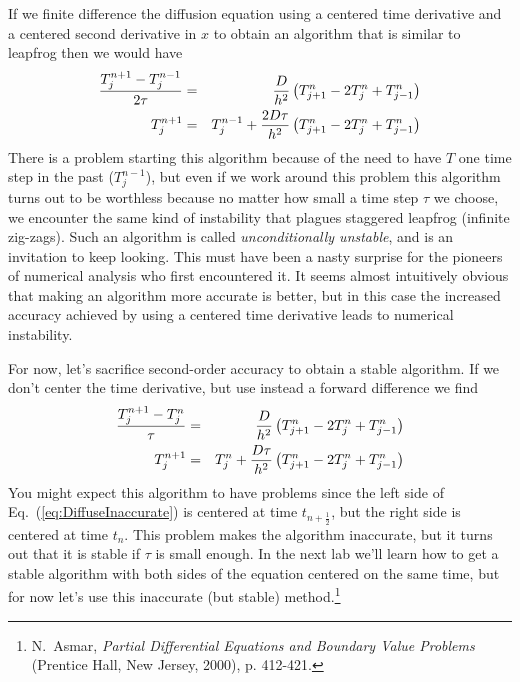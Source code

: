 If we finite difference the diffusion equation using a centered time
derivative and a centered second derivative in $x$ to obtain an
algorithm that is similar to leapfrog then we would have
\begin{eqnarray}
    {T_j^{n+1}-T_j^{n-1} \over 2 \tau} &=&
    {D \over h^2} \left( T^n_{j+1}-2T^n_j+T^n_{j-1} \right)
    \\
    T^{n+1}_j &=& T^{n-1}_j + {2 D \tau \over h^2}
    \left( T^n_{j+1}-2T^n_j+T^n_{j-1} \right)
\end{eqnarray}
There is a problem starting this algorithm because of the need to
have $T$ one time step in the past ($T^{n-1}_j$), but even if we work
around this problem this algorithm turns out to be worthless because
no matter how small a time step $\tau$ we choose, we encounter the
same kind of instability that plagues staggered leapfrog (infinite
zig-zags). Such an algorithm is called {\it unconditionally
unstable}, and is an invitation to keep looking. This must have been
a nasty surprise for the pioneers of numerical analysis who first
encountered it. It seems almost intuitively obvious that making an
algorithm more accurate is better, but in this case the increased
accuracy achieved by using a centered time derivative leads to
numerical instability.

For now, let's sacrifice second-order accuracy to obtain a stable
algorithm.  If we don't center the time derivative, but use instead a
forward difference we find
\begin{eqnarray}
    {T_j^{n+1}-T_j^n \over  \tau} &=& {D \over h^2}
    \left( T^n_{j+1}-2T^n_j+T^n_{j-1} \right)
    \label{eq:DiffuseInaccurate}
    \\
    T^{n+1}_j &=& T^n_j + { D \tau \over h^2}
    \left( T^n_{j+1}-2T^n_j+T^n_{j-1} \right)
\end{eqnarray}
You might expect this algorithm to have problems since the left side
of Eq.~(\ref{eq:DiffuseInaccurate}) is centered at time
$t_{n+\frac{1}{2}}$, but the right side is centered at time $t_n$.
This problem makes the algorithm inaccurate, but it turns out that it
is stable if $\tau$ is small enough. In the next lab we'll learn how
to get a stable algorithm with both sides of the equation centered on
the same time, but for now let's use this inaccurate (but stable)
method.\footnote{N.\ Asmar, {\it Partial Differential Equations and
Boundary Value Problems} (Prentice Hall, New Jersey, 2000), p.
412-421.}

